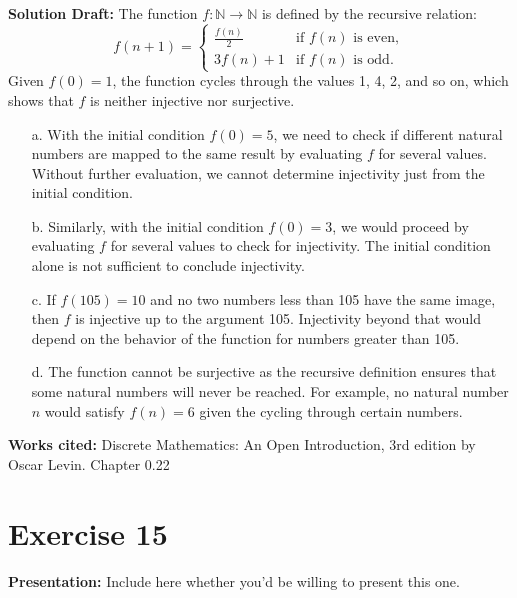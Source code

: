 \documentclass{article}
\begin{document}
\noindent\textbf{Solution Draft:} 
The function \( f : \mathbb{N} \rightarrow \mathbb{N} \) is defined by the recursive relation:
\[
f(n + 1) = \begin{cases}
\frac{f(n)}{2} & \text{if } f(n) \text{ is even}, \\
3f(n) + 1 & \text{if } f(n) \text{ is odd}.
\end{cases}
\]
Given \( f(0) = 1 \), the function cycles through the values 1, 4, 2, and so on, which shows that \( f \) is neither injective nor surjective.

\begin{enumerate}
\item[a.]
With the initial condition \( f(0) = 5 \), we need to check if different natural numbers are mapped to the same result by evaluating \( f \) for several values. Without further evaluation, we cannot determine injectivity just from the initial condition.

\item[b.]
Similarly, with the initial condition \( f(0) = 3 \), we would proceed by evaluating \( f \) for several values to check for injectivity. The initial condition alone is not sufficient to conclude injectivity.

\item[c.]
If \( f(105) = 10 \) and no two numbers less than 105 have the same image, then \( f \) is injective up to the argument 105. Injectivity beyond that would depend on the behavior of the function for numbers greater than 105.

\item[d.]
The function cannot be surjective as the recursive definition ensures that some natural numbers will never be reached. For example, no natural number \( n \) would satisfy \( f(n) = 6 \) given the cycling through certain numbers.
\end{enumerate}

\vspace{0.5cm}
\textbf{Works cited:}
Discrete Mathematics: An Open Introduction, 3rd edition by Oscar Levin. Chapter 0.22

\section*{Exercise 15}  

\noindent\textbf{Presentation:} Include here whether you'd be willing to present this one. 

\vspace{0.5cm} %
\end{document}

